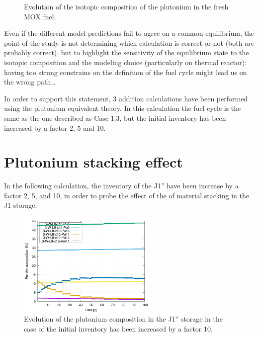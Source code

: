\documentclass[10pt]{article}
\begin{document}
\begin{figure}[h!]
  \centering
  

  \caption{ Evolution of the isotopic composition of the plutonium in the fresh MOX fuel.
    \label{fig:pu_compo} } 
  \end{figure}

Even if the different model predictions fail to agree on a common equilibrium,
the point of the study is not determining which calculation is correct or not
(both are probably correct), but to highlight the sensitivity of the equilibrium
state to the isotopic composition and the modeling choice (particularly on
thermal reactor): having too strong constrains on the definition of the fuel
cycle might lead us on the wrong path\dots


In order to support this statement, 3 addition calculations have been performed
using the plutonium equivalent theory. In this calculation the fuel cycle is
the same as the one described as Case 1.3, but the initial inventory has been
increased by a factor 2, 5 and 10.


\section{Plutonium stacking effect}

In the following calculation, the inventory of the J1'' have been increase by a
factor 2, 5, and 10, in order to probe the effect of the of material stacking in
the J1 storage.

\begin{figure}[h!]
  \centering
  \includegraphics[width=0.6\textwidth]  {img/C_1_3_W_LII_x10_pu_composition}
  \caption{Evolution of the plutonium composition in the J1'' storage in the
  case of the initial inventory has been increased by a factor 10.}
  \label{fig:LII_compo_x10}
\end{figure}
\end{document}
